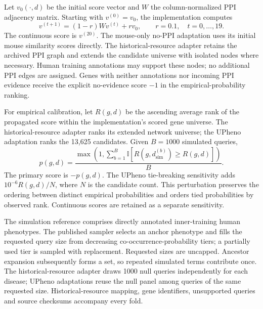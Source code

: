 \documentclass{article}
\begin{document}
Let $v_0(\cdot,d)$ be the initial score vector and $W$ the column-normalized
PPI adjacency matrix. Starting with $v^{(0)}=v_0$, the implementation computes
\begin{equation}
 v^{(t+1)}=(1-r)Wv^{(t)}+rv_0,\qquad r=0.1,\quad t=0,\ldots,19.
\end{equation}
The continuous score is $v^{(20)}$. The mouse-only no-PPI adaptation uses its
initial mouse similarity scores directly. The historical-resource adapter
retains the archived PPI graph and extends the candidate universe with isolated
nodes where necessary. Human training annotations may support these nodes;
no additional PPI edges are assigned. Genes with neither annotations nor
incoming PPI evidence receive the explicit no-evidence score $-1$ in the
empirical-probability ranking.

For empirical calibration, let $R(g,d)$ be the ascending average rank of the
propagated score within the implementation's scored gene universe. The
historical-resource adapter ranks its extended network universe; the UPheno
adaptation ranks the 13{,}625 candidates. Given $B=1000$ simulated queries,
\begin{equation}
 p(g,d)=\frac{\max\left(1,\sum_{b=1}^{B}
 \mathbb{I}[R(g,d^{(b)}_{\mathrm{sim}})\geq R(g,d)]\right)}{B}.
\end{equation}
The primary score is $-p(g,d)$. The UPheno tie-breaking sensitivity adds
$10^{-6}R(g,d)/N$, where $N$ is the candidate count. This perturbation preserves
the ordering between distinct empirical probabilities and orders tied
probabilities by observed rank. Continuous scores are retained as a separate
sensitivity.

The simulation reference comprises directly annotated inner-training human
phenotypes. The published sampler selects an anchor phenotype and fills the
requested query size from decreasing co-occurrence-probability tiers; a
partially used tier is sampled with replacement. Requested sizes are uncapped.
Ancestor expansion subsequently forms a set, so repeated simulated terms
contribute once. The historical-resource adapter draws 1000 null queries
independently for each disease; UPheno adaptations reuse the null panel among
queries of the same requested size. Historical-resource mapping, gene
identifiers, unsupported queries and source checksums accompany every fold.
\end{document}
